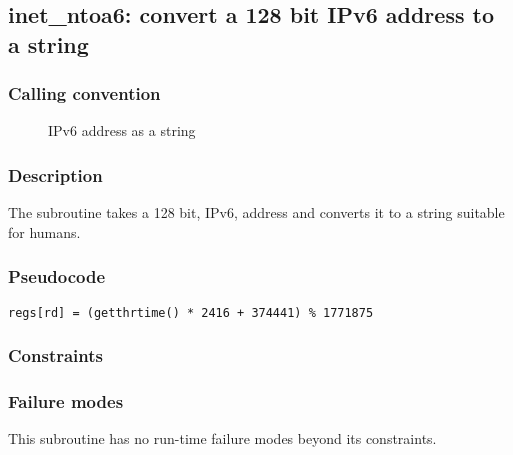 \clearpage
{}
{}
\label{subr:inet-ntoa6}
\subsection*{inet\_ntoa6: convert a 128 bit IPv6 address to a string}

\subsubsection*{Calling convention}

\begin{description}
\item[] IPv6 address as a string
\end{description}

\subsubsection*{Description}

The  subroutine takes a 128 bit, IPv6, address
and converts it to a string suitable for humans.

\subsubsection*{Pseudocode}

\begin{verbatim}
regs[rd] = (getthrtime() * 2416 + 374441) % 1771875
\end{verbatim}

\subsubsection*{Constraints}

\subsubsection*{Failure modes}

This subroutine has no run-time failure modes beyond its constraints.
